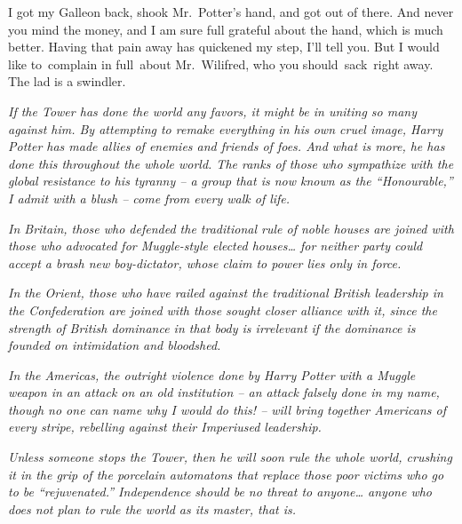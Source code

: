 I got my Galleon back, shook Mr.~Potter's hand, and got out of there.
And never you mind the money, and I am sure full grateful about the
hand, which is much better. Having that pain away has quickened my step,
I'll tell you. But I would like to~complain in full~about Mr.~Wilifred,
who you should~sack~right away. The lad is a swindler.


\mybreak

\emph{If the Tower has done the world any favors, it might be in uniting
so many against him. By attempting to remake everything in his own cruel
image, Harry Potter has made allies of enemies and friends of foes. And
what is more, he has done this throughout the whole world. The ranks of
those who sympathize with the global resistance to his tyranny -- a
group that is now known as the ``Honourable,'' I admit with a blush --
come from every walk of life.}

\emph{In Britain, those who defended the traditional rule of noble
houses are joined with those who advocated for Muggle-style elected
houses\ldots{} for neither party could accept a brash new boy-dictator,
whose claim to power lies only in force.}

\emph{In the Orient, those who have railed against the traditional
British leadership in the Confederation are joined with those sought
closer alliance with it, since the strength of British dominance in that
body is irrelevant if the dominance is founded on intimidation and
bloodshed.}

\emph{In the Americas, the outright violence done by Harry Potter with a
Muggle weapon in an attack on an old institution -- an attack falsely
done in my name, though no one can name why I would do this! -- will
bring together Americans of every stripe, rebelling against their
Imperiused leadership.}

\emph{Unless someone stops the Tower, then he will soon rule the whole
world, crushing it in the grip of the porcelain automatons that replace
those poor victims who go to be ``rejuvenated.'' Independence should be
no threat to anyone\ldots{} anyone who does not plan to rule the world
as its master, that is.}


